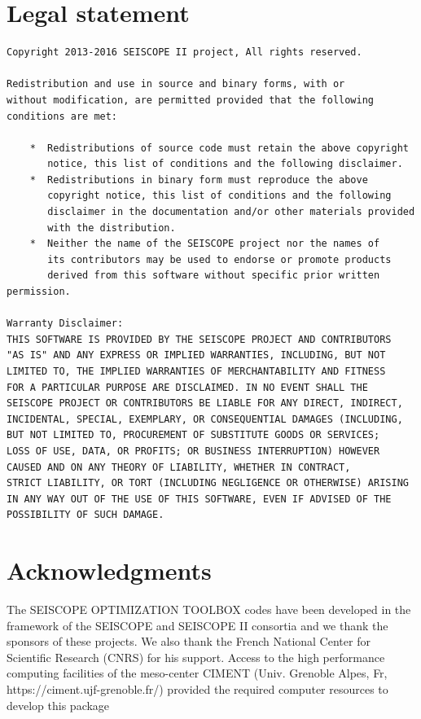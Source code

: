 \documentclass[a4paper,twoside,final,onecolumn,11pt,openright]{article}
\begin{document}
\section*{Legal statement}
\small
\begin{verbatim}
Copyright 2013-2016 SEISCOPE II project, All rights reserved.

Redistribution and use in source and binary forms, with or
without modification, are permitted provided that the following
conditions are met:

    *  Redistributions of source code must retain the above copyright
       notice, this list of conditions and the following disclaimer.
    *  Redistributions in binary form must reproduce the above
       copyright notice, this list of conditions and the following
       disclaimer in the documentation and/or other materials provided
       with the distribution.
    *  Neither the name of the SEISCOPE project nor the names of
       its contributors may be used to endorse or promote products
       derived from this software without specific prior written permission.

Warranty Disclaimer:
THIS SOFTWARE IS PROVIDED BY THE SEISCOPE PROJECT AND CONTRIBUTORS
"AS IS" AND ANY EXPRESS OR IMPLIED WARRANTIES, INCLUDING, BUT NOT
LIMITED TO, THE IMPLIED WARRANTIES OF MERCHANTABILITY AND FITNESS
FOR A PARTICULAR PURPOSE ARE DISCLAIMED. IN NO EVENT SHALL THE
SEISCOPE PROJECT OR CONTRIBUTORS BE LIABLE FOR ANY DIRECT, INDIRECT,
INCIDENTAL, SPECIAL, EXEMPLARY, OR CONSEQUENTIAL DAMAGES (INCLUDING,
BUT NOT LIMITED TO, PROCUREMENT OF SUBSTITUTE GOODS OR SERVICES;
LOSS OF USE, DATA, OR PROFITS; OR BUSINESS INTERRUPTION) HOWEVER
CAUSED AND ON ANY THEORY OF LIABILITY, WHETHER IN CONTRACT,
STRICT LIABILITY, OR TORT (INCLUDING NEGLIGENCE OR OTHERWISE) ARISING
IN ANY WAY OUT OF THE USE OF THIS SOFTWARE, EVEN IF ADVISED OF THE
POSSIBILITY OF SUCH DAMAGE.
\end{verbatim}
\normalsize

\section*{Acknowledgments}
The SEISCOPE OPTIMIZATION TOOLBOX codes have been developed in the framework of the SEISCOPE and SEISCOPE II consortia and we thank
the sponsors of these projects. We also thank the French National Center for Scientific Research (CNRS) for his support. Access to the high  performance computing facilities of the meso-center CIMENT (Univ. Grenoble Alpes, Fr, https://ciment.ujf-grenoble.fr/) provided the required computer resources to develop this package
\end{document}
